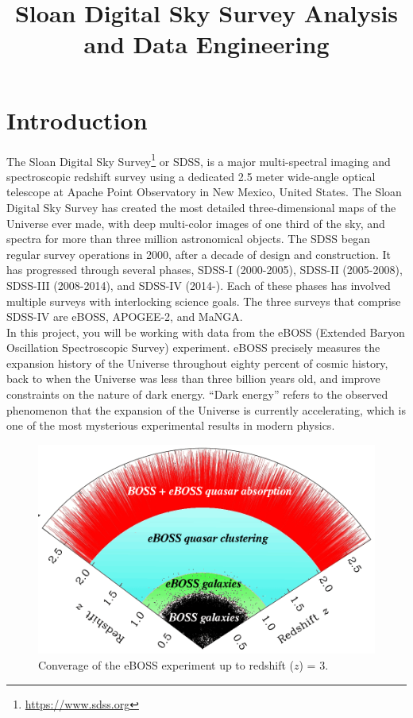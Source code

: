 

\title{Sloan Digital Sky Survey Analysis and Data Engineering}
\maketitle

\section{Introduction}
\label{sec:introduction}

The Sloan Digital Sky Survey\footnote{\href{https://www.sdss.org}{https://www.sdss.org}} or SDSS, is a major multi-spectral imaging and spectroscopic redshift survey using a dedicated 2.5 meter wide-angle optical telescope at Apache Point Observatory in New Mexico, United States. The Sloan Digital Sky Survey has created the most detailed three-dimensional maps of the Universe ever made, with deep multi-color images of one third of the sky, and spectra for more than three million astronomical objects. The SDSS began regular survey operations in 2000, after a decade of design and construction.  It has progressed through several phases, SDSS-I (2000-2005), SDSS-II (2005-2008), SDSS-III (2008-2014), and SDSS-IV (2014-).  Each of these phases has involved multiple surveys with interlocking science goals.  The three surveys that comprise SDSS-IV are eBOSS, APOGEE-2, and MaNGA.\\

In this project, you will be working with data from the eBOSS (Extended Baryon Oscillation Spectroscopic Survey) experiment. eBOSS precisely measures the expansion history of the Universe throughout eighty percent of cosmic history, back to when the Universe was less than three billion years old, and improve constraints on the nature of dark energy. “Dark energy” refers to the observed phenomenon that the expansion of the Universe is currently accelerating, which is one of the most mysterious experimental results in modern physics.

\begin{figure}[H]
  \centering
  \includegraphics[width=.5\textwidth]{figures/eboss_coverage}
  \caption{Converage of the eBOSS experiment up to redshift ($z$) = 3.}
  \label{fig:eboss_coverage}
\end{figure}

